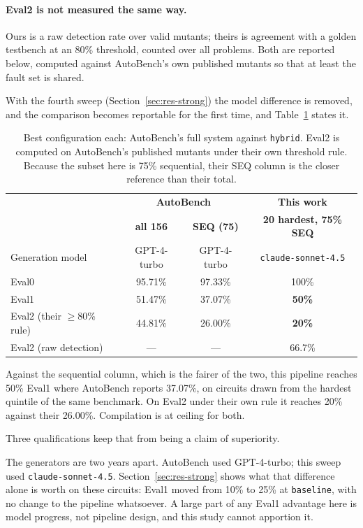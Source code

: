\documentclass[11pt,a4paper,titlepage=false]{scrreprt}
\begin{document}
\paragraph{Eval2 is not measured the same way.} Ours is a raw detection rate over valid
mutants; theirs is agreement with a golden testbench at an 80\% threshold, counted over all
problems. Both are reported below, computed against AutoBench's own published mutants so that
at least the fault set is shared.

With the fourth sweep (Section~\ref{sec:res-strong}) the model difference is removed, and the
comparison becomes reportable for the first time, and Table~\ref{tab:vs-autobench} states it.

\begin{table}[H]
\centering
\small
\begin{tabular}{@{}l c c c@{}}
\toprule
 & \multicolumn{2}{c}{\textbf{AutoBench}} & \textbf{This work} \\
 & \textbf{all 156} & \textbf{SEQ (75)} & \textbf{20 hardest, 75\% SEQ} \\
\midrule
Generation model & GPT-4-turbo & GPT-4-turbo & \texttt{claude-sonnet-4.5} \\
Eval0            & 95.71\% & 97.33\% & 100\% \\
Eval1            & 51.47\% & 37.07\% & \textbf{50\%} \\
Eval2 (their $\geq$80\% rule) & 44.81\% & 26.00\% & \textbf{20\%} \\
Eval2 (raw detection) & --- & --- & 66.7\% \\
\bottomrule
\end{tabular}
\caption{Best configuration each: AutoBench's full system against \texttt{hybrid}. Eval2 is
computed on AutoBench's published mutants under their own threshold rule. Because the subset
here is 75\% sequential, their SEQ column is the closer reference than their total.}
\label{tab:vs-autobench}
\end{table}

Against the sequential column, which is the fairer of the two, this pipeline reaches 50\%
Eval1 where AutoBench reports 37.07\%, on circuits drawn from the hardest quintile of the same
benchmark. On Eval2 under their own rule it reaches 20\% against their 26.00\%. Compilation is
at ceiling for both.

Three qualifications keep that from being a claim of superiority.

The generators are two years apart. AutoBench used GPT-4-turbo; this sweep used
\texttt{claude-\allowbreak sonnet-4.5}. Section~\ref{sec:res-strong} shows what that
difference alone is worth on these circuits: Eval1 moved from 10\% to 25\% at
\texttt{baseline}, with no change to the pipeline whatsoever. A large part of any Eval1 advantage here is model progress, not
pipeline design, and this study cannot apportion it.
\end{document}
